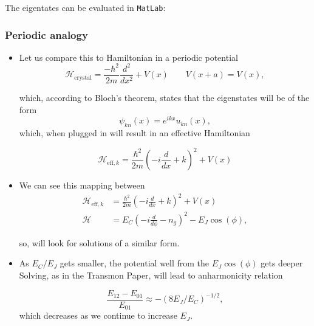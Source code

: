  The eigentates can be evaluated in \verb|MatLab|:


 \subsubsection{Periodic analogy}
 \label{sec:periodic-analogy}

 \begin{itemize}
 \item Let us compare this to Hamiltonian in a periodic potential
   \begin{equation}
     \mathcal{H}_\text{crystal} = \frac{-\hbar^2}{2m}\frac{d^2}{dx^2}+V(x)\qquad V(x+a) = V(x),
   \end{equation}

   \noindent which, according to Bloch's theorem, states that the eigenstates will be of the form
   \begin{equation}
     \psi_{kn}(x) = e^{ikx}u_{kn}(x),
   \end{equation}
   \noindent which, when plugged in will result in an effective Hamiltonian

  \begin{equation}
    \mathcal{H}_{\text{eff},k} = \frac{\hbar^2}{2m}\left(-i\frac{d}{dx}+k\right)^2 + V(x)
  \end{equation}
\item We can see this mapping between
  \begin{equation}
    \begin{aligned}
      \mathcal{H}_{\text{eff},k} & = \frac{\hbar^2}{2m}\left(-i\frac{d}{dx}+k\right)^2 + V(x)\\
      \mathcal{H} & = E_C\left(-i\frac{d}{d\phi} - n_g\right)^2 - E_J\cos(\phi),
    \end{aligned}
  \end{equation}

  \noindent so, will look for solutions of a similar form.
\item As $ E_C/E_J $ gets smaller, the potential well from the $ E_J\cos(\phi) $ gets deeper   Solving, as in the Transmon Paper, will lead
  to anharmonicity relation

  \begin{framed}\noindent
    \begin{equation} \frac{E_{12} - E_{01}}{E_{01}}\approx -(8E_J/E_C)^{-1/2},
    \end{equation}
    \noindent which decreases as we continue to increase $ E_J $.
  \end{framed}
\end{itemize}
\newpage

